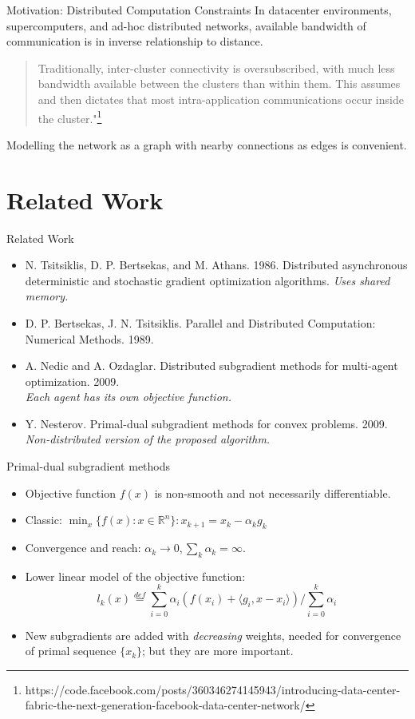 \documentclass{beamer}
\begin{document}
	\begin{frame}{Motivation: Distributed Computation Constraints}
		In datacenter environments, supercomputers, and ad-hoc
		distributed networks, available bandwidth of communication 
		is in inverse relationship to distance.
		\begin{quote}Traditionally, inter-cluster connectivity is oversubscribed, with much less bandwidth available between the clusters than within them. This assumes and then dictates that most intra-application communications occur inside the cluster."\footnote{https://code.facebook.com/posts/360346274145943/introducing-data-center-fabric-the-next-generation-facebook-data-center-network/}\end{quote}
		
		Modelling the network as a graph with nearby connections as
		edges is convenient.
	\end{frame}
	
	\section{Related Work}
	\begin{frame}{Related Work}
		\begin{itemize}
			\item N. Tsitsiklis, D. P. Bertsekas, and M. Athans. 1986.
Distributed asynchronous deterministic and stochastic
gradient optimization algorithms. \emph{Uses shared memory.}
			\item D. P. Bertsekas, J. N. Tsitsiklis. Parallel and Distributed Computation: Numerical Methods. 1989.
			\item A. Nedic and A. Ozdaglar. Distributed subgradient methods for multi-agent optimization. 2009.\\ 
			\emph{Each agent has its own objective function.}
			\item Y. Nesterov. Primal-dual subgradient methods for convex problems. 2009. \\
			\emph{Non-distributed version of the proposed algorithm.}
		\end{itemize}
	\end{frame}
	
	\begin{frame}{Primal-dual subgradient methods}
		\begin{itemize}
			\item Objective function $f(x)$ is non-smooth and not necessarily differentiable.
			\item Classic: $\min_x\{f(x):x \in \mathbb{R}^n\} : x_{k+1} = x_k - \alpha_k g_k$
			\item Convergence and reach: $\alpha_k \rightarrow 0, \sum_k \alpha_k = \infty.$	
			\item Lower linear model of the objective function:
			\[ l_k(x) \overset{def}{=} \sum_{i=0}^k \alpha_i(f(x_i) + \langle g_i, x-x_i \rangle) / \sum_{i=0}^k  \alpha_i \]
			\item New subgradients are added with \emph{decreasing} weights, needed for convergence
				of primal sequence $\{x_k\}$; but they are more important.
		\end{itemize}
	\end{frame}
	
\end{document}
